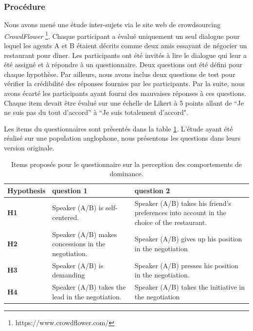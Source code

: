 {			\subsubsection{Procédure}
					\label{sec:questionnaire}
					Nous avons mené une étude inter-sujets via le site web de crowdsourcing  \emph {CrowdFlower} \footnote {https://www.crowdflower.com/}.
					Chaque participant a évalué uniquement un seul dialogue pour lequel les agents A et B étaient décrits comme deux amis essayant de négocier un restaurant pour dîner.
					Les participants ont été invités à lire le dialogue qui leur a été assigné et à répondre à un questionnaire.
					Deux questions ont été défini pour chaque hypothèse. Par ailleurs, nous avons inclus deux questions de test pour vérifier la crédibilité des réponses fournies par les participants. Par la suite, nous avons écarté les participants ayant fourni des mauvaises réponses à ces questions. 
					Chaque item devait être évalué sur une échelle de Likert à 5 points allant de ``Je ne suis pas du tout d'accord'' à ``Je suis totalement d'accord".
			
					Les items du questionnaires sont présentés dans la table \ref{table:questionnaire}. L'étude ayant été réalisé sur une population anglophone, nous présentons les questions dans leurs version originale. 
						
								\begin{table}[h]
																\centering
								\begin{tabular}{|p{1.75cm}|p{5cm}|p{5.5cm}|}

									\hline
									Hypothesis &question 1& question 2 \\
									\hline
									\textbf{H1} &Speaker (A/B) is self-centered. &Speaker (A/B) takes his friend's preferences into account in the choice of the restaurant.\\
									\hline
									\textbf{H2} &Speaker (A/B) makes concessions in the negotiation.&Speaker (A/B) gives up his position in the negotiation\\
									\hline
									\textbf{H3} & Speaker (A/B) is demanding&Speaker (A/B) presses his position in the negotiation. \\
									\hline
									\textbf{H4} &Speaker (A/B) takes the lead in the negotiation.&Speaker (A/B) takes the initiative in the negotiation \\
									\hline
								\end{tabular}
							
							\caption{Items proposés pour le questionnaire sur la perception des comportements de dominance.}
							\label{table:questionnaire}
						\end{table}
					
}
